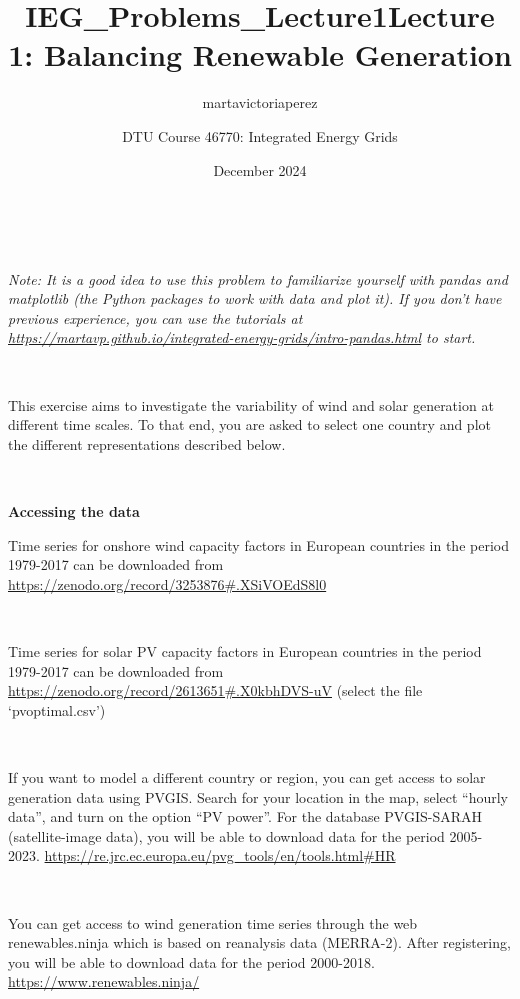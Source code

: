 \documentclass[10pt]{article}
\title{IEG_Problems_Lecture1}
\author{martavictoriaperez }
\date{December 2024}
\newenvironment{problem}[2][Problem]{\begin{trivlist}
\item[\hskip \labelsep {\bfseries #1}\hskip \labelsep {\bfseries #2.}]}{\end{trivlist}}
\begin{document}
 
\title{\textbf{Lecture 1: Balancing Renewable Generation}}
\author{
DTU Course 46770: Integrated Energy Grids }
\maketitle
 
\begin{problem}{1.1. Analyzing solar and wind generation time series}

\

\textit{Note: It is a good idea to use this problem to familiarize yourself with pandas and matplotlib (the Python packages to work with data and plot it). If you don't have previous experience, you can use the tutorials at \url{https://martavp.github.io/integrated-energy-grids/intro-pandas.html} to start.}

\

This exercise aims to investigate the variability of wind and solar generation at different time scales. To that end, you are asked to select one country and plot the different representations described below.

\

\textbf{Accessing the data}

Time series for onshore wind capacity factors in European countries in the period 1979-2017 can be downloaded from \url{https://zenodo.org/record/3253876#.XSiVOEdS8l0}

\

Time series for solar PV capacity factors in European countries in the period 1979-2017 can be downloaded from \url{https://zenodo.org/record/2613651#.X0kbhDVS-uV} (select the file ‘pvoptimal.csv’)

\

If you want to model a different country or region, you can get access to solar generation data using PVGIS. Search for your location in the map, select “hourly data”, and turn on the option “PV power”. For the database PVGIS-SARAH (satellite-image data), you will be able to download data for the period 2005-2023. \url{https://re.jrc.ec.europa.eu/pvg_tools/en/tools.html#HR}

\

You can get access to wind generation time series through the web renewables.ninja which is based on reanalysis data (MERRA-2). After registering, you will be able to download data for the period 2000-2018. \href{https://www.renewables.ninja/}{https://www.renewables.ninja/}


\end{problem}
\end{document}
